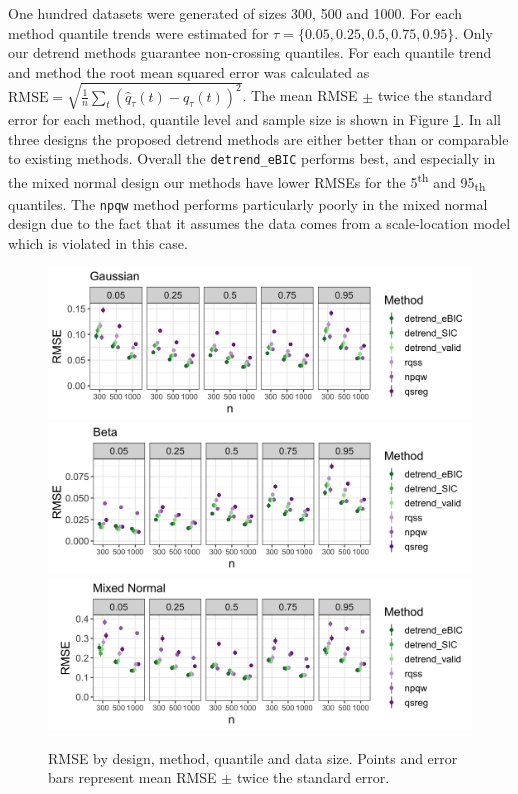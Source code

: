 \documentclass[12pt]{article}
\begin{document}
	One hundred datasets were generated of sizes 300, 500 and 1000. For each method quantile trends were estimated for $\tau = \{0.05, 0.25, 0.5, 0.75, 0.95\}$. Only our detrend methods guarantee non-crossing quantiles. For each quantile trend and method the root mean squared error was calculated as $\mbox{RMSE} = \sqrt{\frac{1}{n}\sum_t (\hat{q}_{\tau}(t) - q_\tau(t))^2}$. The mean RMSE $\pm$ twice the standard error for each method, quantile level and sample size is shown in Figure \ref{fig:quantile_mse}. 	In all three designs the proposed detrend methods are either better than or comparable to existing methods. Overall the \texttt{detrend\_eBIC} performs best, and especially in the mixed normal design our methods have lower RMSEs for the 5\textsuperscript{th} and 95\textsubscript{th} quantiles. The \texttt{npqw} method performs particularly poorly in the mixed normal design due to the fact that it assumes the data comes from a scale-location model which is violated in this case. 
	
	\begin{figure}
		\includegraphics[width=\linewidth]{Figures/gaus_mse.png}	
		\includegraphics[width=\linewidth]{Figures/shapebeta_mse.png}
		\includegraphics[width=\linewidth]{Figures/mixednorm_mse.png}
		\caption{RMSE by design, method, quantile and data size. Points and error bars represent mean RMSE $\pm$ twice the standard error.}		
		\label{fig:quantile_mse}
	\end{figure}
\end{document}
